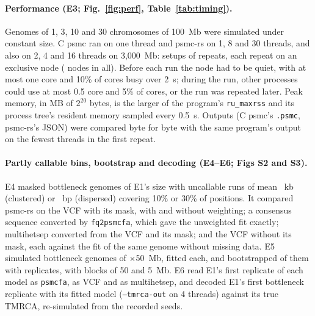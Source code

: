 \documentclass[11pt]{article}
\newcommand{\psmcrs}{psmc-rs}
\newcommand{\opt}[1]{\texttt{#1}}
\begin{document}
\paragraph{Performance (E3; Fig.~\ref{fig:perf}, Table~\ref{tab:timing}).} Genomes of 1, 3, 10 and 30 chromosomes of 100~Mb were simulated under constant size. C psmc ran on one thread and \psmcrs{} on 1, 8 and 30 threads, and also on 2, 4 and 16 threads on 3,000~Mb: \EthreeSetups{} setups of \EthreeRepeatsW{} repeats, each repeat on an exclusive \EthreeCpu{} node (\EthreeNodesW{} nodes in all). Before each run the node had to be quiet, with at most one core and 10\% of cores busy over 2~s; during the run, other processes could use at most 0.5 core and 5\% of cores, or the run was repeated later. Peak memory, in MB of $2^{20}$ bytes, is the larger of the program's \texttt{ru\_maxrss} and its process tree's resident memory sampled every 0.5~s. Outputs (C psmc's \texttt{.psmc}, \psmcrs{}'s JSON) were compared byte for byte with the same program's output on the fewest threads in the first repeat.

\paragraph{Partly callable bins, bootstrap and decoding (E4--E6; Figs S2 and S3).} E4 masked \EfourRepsW{} bottleneck genomes of E1's size with uncallable runs of mean \EfourClusRunKb{}~kb (clustered) or \EfourDispRunBp{}~bp (dispersed) covering 10\% or 30\% of positions. It compared \psmcrs{} on the VCF with its mask, with and without weighting; a consensus sequence converted by \texttt{fq2psmcfa}, which gave the unweighted fit exactly; multihetsep converted from the VCF and its mask; and the VCF without its mask, each against the fit of the same genome without missing data. E5 simulated \EfiveFits{} bottleneck genomes of \EfiveChroms{}$\times$50~Mb, fitted each, and bootstrapped \EfiveDatasets{} of them with \EfiveReps{} replicates, with blocks of 50 and 5~Mb. E6 read E1's first replicate of each model as \texttt{psmcfa}, as VCF and as multihetsep, and decoded E1's first bottleneck replicate with its fitted model (\opt{--tmrca-out} on 4 threads) against its true TMRCA, re-simulated from the recorded seeds.
\end{document}
